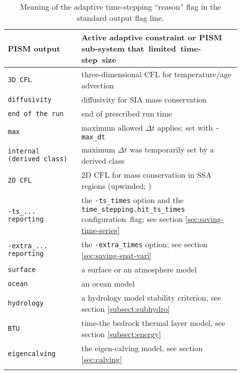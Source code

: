 \begin{table}[ht]
\centering
\begin{tabular}{p{0.3\linewidth}p{0.65\linewidth}}\toprule
  \textbf{PISM output} & \textbf{Active adaptive constraint or PISM sub-system \mbox{that limited time-step size}} \\ \midrule
  \texttt{3D CFL} & three-dimensional CFL for temperature/age advection \cite{BBL} \\
  \texttt{diffusivity} & diffusivity for SIA mass conservation \cite{BBL,HindmarshPayne} \\
  \texttt{end of the run} & end of prescribed run time \\
  \texttt{max} & maximum allowed $\Delta t$ applies; set with \texttt{-max_dt} \\
  \texttt{internal (derived class)} & maximum $\Delta t$ was temporarily set by a derived class \\
  \texttt{2D CFL} & 2D CFL for mass conservation in SSA regions (upwinded; \cite{BBssasliding})\\
  \texttt{-ts_... reporting} & the \texttt{-ts_times} option and the \mbox{\texttt{time_stepping.hit_ts_times}} \mbox{configuration flag}; see section \ref{sec:saving-time-series} \\
  \texttt{-extra_... reporting} & the \texttt{-extra_times} option; see section \ref{sec:saving-spat-vari} \\
  \texttt{surface} & a surface or an atmosphere model \\
  \texttt{ocean} & an ocean model \\
  \texttt{hydrology} & a hydrology model stability criterion, see section \ref{subsect:subhydro} \\
  \texttt{BTU} & time-the bedrock thermal layer model, see section \ref{subsect:energy} \\
  \texttt{eigencalving} & the eigen-calving model, see section \ref{sec:calving} \\
  
  \bottomrule
  \normalsize
\end{tabular}
\caption{Meaning of the adaptive time-stepping ``reason'' flag in the standard output flag line.}
\label{tab:adaptiveflag}
\end{table}

